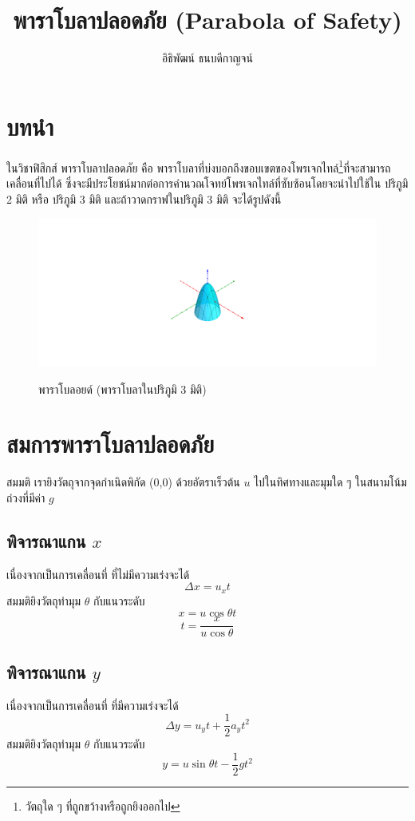 \documentclass[a4paper,12pt]{article}
\title{พาราโบลาปลอดภัย (Parabola of Safety)}
\author{อิธิพัฒน์ ธนบดีกาญจน์}
\begin{document}
	
\maketitle

\section{บทนำ}
ในวิชาฟิสิกส์ พาราโบลาปลอดภัย คือ พาราโบลาที่บ่งบอกถึงขอบเขตของโพรเจกไทล์\footnote{วัตถุใด ๆ ที่ถูกขว้างหรือถูกยิงออกไป}ที่จะสามารถเคลื่อนที่ไปได้ ซึ่งจะมีประโยชน์มากต่อการคำนวณโจทย์โพรเจกไทล์ที่ซับซ้อนโดยจะนำไปใช้ใน ปริภูมิ 2 มิติ หรือ ปริภูมิ 3 มิติ และถ้าวาดกราฟในปริภูมิ 3 มิติ จะได้รูปดังนี้
	\begin{figure}[h]
		\centering
		\includegraphics[width=0.7\linewidth]{paraboloid_reduced}	
		\label{fig:pd}
		\caption{พาราโบลอยด์ (พาราโบลาในปริภูมิ 3 มิติ)}
	\end{figure}

\section{สมการพาราโบลาปลอดภัย}
สมมติ เรายิงวัตถุจากจุดกำเนิดพิกัด (0,0) ด้วยอัตราเร็วต้น $u$ ไปในทิศทางและมุมใด ๆ ในสนามโน้มถ่วงที่มีค่า $g$\\

	\subsection{พิจารณาแกน $x$}
	เนื่องจากเป็นการเคลื่อนที่ ที่ไม่มีความเร่งจะได้ 
	$$\Delta x=u_xt$$
	สมมติยิงวัตถุทำมุม $\theta$ กับแนวระดับ
	$$x=u\cos\theta t$$
	\begin{equation}\label{x_eq}
	t=\frac{x}{u\cos\theta}
	\end{equation}
	
	\subsection{พิจารณาแกน $y$}
	เนื่องจากเป็นการเคลื่อนที่ ที่มีความเร่งจะได้
	$$\Delta y=u_yt+\frac{1}{2}a_yt^2$$
	สมมติยิงวัตถุทำมุม $\theta$ กับแนวระดับ
	\begin{equation}\label{y_eq}
	y=u\sin\theta t-\frac{1}{2}gt^2
	\end{equation}
\end{document}
